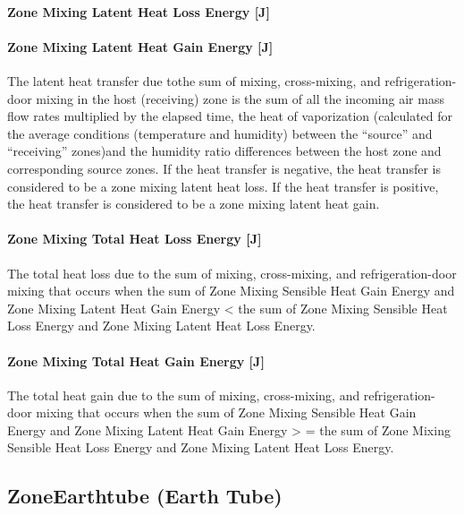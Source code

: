 \paragraph{Zone Mixing Latent Heat Loss Energy {[}J{]}}\label{zone-mixing-latent-heat-loss-energy-j-2}

\paragraph{Zone Mixing Latent Heat Gain Energy {[}J{]}}\label{zone-mixing-latent-heat-gain-energy-j-2}

The latent heat transfer due tothe sum of mixing, cross-mixing, and refrigeration-door mixing in the host (receiving) zone is the sum of all the incoming air mass flow rates multiplied by the elapsed time, the heat of vaporization (calculated for the average conditions (temperature and humidity) between the ``source'' and ``receiving'' zones)and the humidity ratio differences between the host zone and corresponding source zones. If the heat transfer is negative, the heat transfer is considered to be a zone mixing latent heat loss. If the heat transfer is positive, the heat transfer is considered to be a zone mixing latent heat gain.

\paragraph{Zone Mixing Total Heat Loss Energy {[}J{]}}\label{zone-mixing-total-heat-loss-energy-j-2}

The total heat loss due to the sum of mixing, cross-mixing, and refrigeration-door mixing that occurs when the sum of Zone Mixing Sensible Heat Gain Energy and Zone Mixing Latent Heat Gain Energy \textless{} the sum of Zone Mixing Sensible Heat Loss Energy and Zone Mixing Latent Heat Loss Energy.

\paragraph{Zone Mixing Total Heat Gain Energy {[}J{]}}\label{zone-mixing-total-heat-gain-energy-j-2}

The total heat gain due to the sum of mixing, cross-mixing, and refrigeration-door mixing that occurs when the sum of Zone Mixing Sensible Heat Gain Energy and Zone Mixing Latent Heat Gain Energy \textgreater{} = the sum of Zone Mixing Sensible Heat Loss Energy and Zone Mixing Latent Heat Loss Energy.

\subsection{ZoneEarthtube (Earth Tube)}\label{zoneearthtube-earth-tube}

